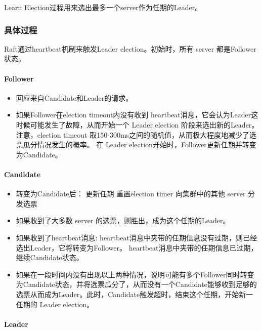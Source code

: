 \documentclass[UTF8]{article}
\begin{document}
Learn Election过程用来选出最多一个server作为任期的Leader。

\subsubsection{具体过程}

Raft通过heartbeat机制来触发Leader election。初始时，所有 server 都是Follower状态。

\paragraph{Follower}

\begin{itemize}
	\item 回应来自Candidate和Leader的请求。
	\item 如果Follower在election timeout内没有收到 heartbeat消息，它会认为Leader这时候可能发生了故障，从而开始一个 Leader election 阶段来选出新的Leader。注意，election timeout 取150-300ms之间的随机值，从而极大程度地减少了选票瓜分情况发生的概率。
		\subitem 在 Leader election开始时，Follower更新任期并转变为Candidate。
\end{itemize}

\paragraph{Candidate}

\begin{itemize}
	\item 转变为Candidate后：
		\subitem 更新任期
		\subitem 重置election timer
		\subitem 向集群中的其他 server 分发选票
	\item 如果收到了大多数 server 的选票，则胜出，成为这个任期的Leader。
	\item 如果收到了heartbeat消息:
		\subitem heartbeat消息中夹带的任期信息没有过期，则已经选出Leader，它将转变为Follower。
		\subitem heartbeat消息中夹带的任期信息已过期，继续Candidate状态。
	\item 如果在一段时间内没有出现以上两种情况，说明可能有多个Follower同时转变为Candidate状态，并将选票瓜分了，从而没有一个Candidate能够收到足够的选票从而成为Leader。此时，Candidate触发超时，结束这个任期，开始新一任期的 Leader election。
\end{itemize}

\paragraph{Leader}
\end{document}
